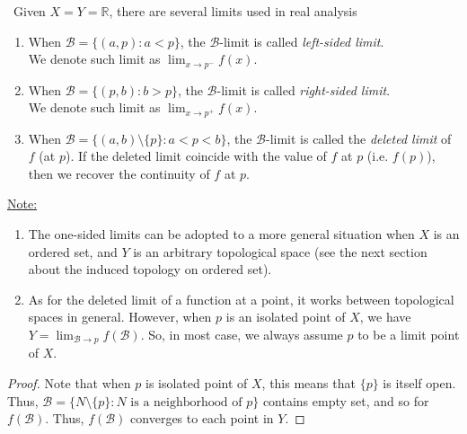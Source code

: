\documentclass{treatise}
\begin{document}
\begin{example} \label{topo-sided-lim} \ 
Given $X = Y = \mathbb{R}$, there are several limits used in real analysis
\begin{enumerate}
    \item When $\mathcal{B} = \{ (a, p) : a < p \}$, the $\mathcal{B}$-limit is called \emph{left-sided limit}.
    \\
    We denote such limit as $\lim_{x \to p^-} f(x)$.
    \item When $\mathcal{B} = \{ (p, b) : b > p \}$, the $\mathcal{B}$-limit is called \emph{right-sided limit}.
    \\
    We denote such limit as $\lim_{x \to p^+} f(x)$.
    \item When $\mathcal{B} = \{ (a, b) \setminus \{ p \} : a < p < b \}$, the $\mathcal{B}$-limit is called the \emph{deleted limit} of $f$ (at $p$). If the deleted limit coincide with the value of $f$ at $p$ (i.e. $f(p)$), then we recover the continuity of $f$ at $p$.
\end{enumerate}
\underline{Note:}
\begin{enumerate}
    \item The one-sided limits can be adopted to a more general situation when $X$ is an ordered set, and $Y$ is an arbitrary topological space (see the next section about the induced topology on ordered set).
    \item As for the deleted limit of a function at a point, it works between topological spaces in general. However, when $p$ is an isolated point of $X$, we have $Y = \lim_{\mathcal{B} \to p} f(\mathcal{B})$. So, in most case, we always assume $p$ to be a limit point of $X$.
\end{enumerate}
\end{example}
\begin{proof}
Note that when $p$ is isolated point of $X$, this means that $\{ p \}$ is itself open. Thus, $\mathcal{B} = \{ N \setminus \{ p \} : N \mbox{ is a neighborhood of } p \}$ contains empty set, and so for $f(\mathcal{B})$. Thus, $f(\mathcal{B})$ converges to each point in $Y$.
\end{proof}

\newpage
\end{document}
